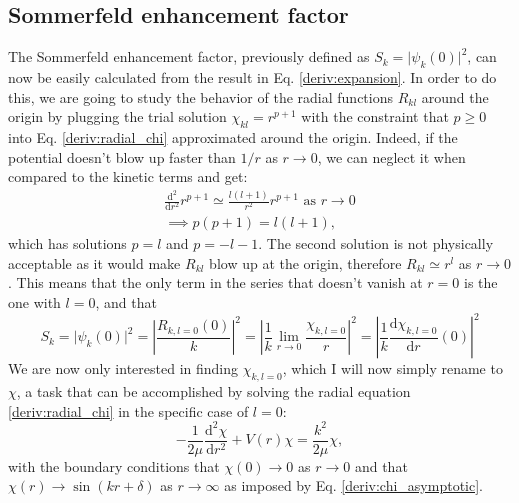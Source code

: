 \subsection{Sommerfeld enhancement factor}
The Sommerfeld enhancement factor, previously defined as \(S_k = \vert \psi _k(0) \vert ^2 \), can now be easily calculated from the result in Eq. \eqref{deriv:expansion}. In order to do this, we are going to study the behavior of the radial functions \(R_{kl} \) around the origin by plugging the trial solution \(\chi_{kl} = r^{p+1} \) with the constraint that \(p\geq 0\) into Eq. \eqref{deriv:radial_chi} approximated around the origin. Indeed, if the potential doesn't blow up faster than \(1 / r\) as \(r \to 0\), we can neglect it when compared to the kinetic terms and get:
\begin{gather}
	\frac{\mathrm{d}^2}{\mathrm{d}r^2} r^{p+1} \simeq \frac{l(l+1)}{r^2}r^{p+1} \text{ as } r \to 0 \\
	\implies p(p+1)=l(l+1),
\end{gather}
which has solutions \(p=l\) and \(p=-l-1\). The second solution is not physically acceptable as it would make \(R_{kl} \) blow up at the origin, therefore \(R_{kl} \simeq r^l \) as \(r \to 0\). This means that the only term in the series that doesn't vanish at \(r=0\) is the one with \(l=0\), and that
\begin{equation}
	S_k=\vert \psi _k (0) \vert ^2 
	= \left\vert \frac{R_{k,l=0}(0)}{k} \right\vert ^2 
	= \left\vert \frac{1}{k}\lim_{r \to 0} \frac{\chi_{k,l=0}}{r} \right\vert ^2
	= \left\vert \frac{1}{k}\frac{\mathrm{d}\chi_{k,l=0}}{\mathrm{d}r} (0) \right\vert ^2
\end{equation}
We are now only interested in finding \(\chi_{k,l=0}\), which I will now simply rename to \(\chi \), a task that can be accomplished by solving the radial equation \eqref{deriv:radial_chi} in the specific case of \(l=0\):
\begin{equation}\label{deriv:goal_equation}
	-\frac{1}{2\mu } \frac{\mathrm{d}^2 \chi}{\mathrm{d}r^2} + V(r) \chi = \frac{k^2}{2\mu } \chi,
\end{equation}
with the boundary conditions that \(\chi (0) \to  0\) as \(r \to 0\) and that \(\chi (r) \to \sin (kr + \delta)\) as \(r \to \infty \) as imposed by Eq. \eqref{deriv:chi_asymptotic}.

